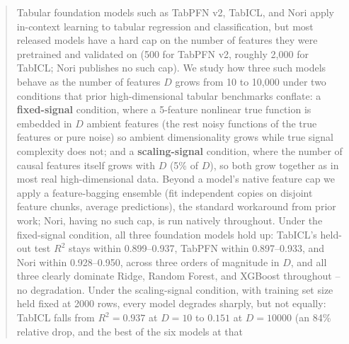 \documentclass{article}
\begin{document}

\printAffiliationsAndNotice{}

\begin{abstract}
Tabular foundation models such as TabPFN v2, TabICL, and Nori apply in-context
learning to tabular regression and classification, but most released models have a
hard cap on the number of features they were pretrained and validated on (500 for
TabPFN v2, roughly 2,000 for TabICL; Nori publishes no such cap). We study how three
such models behave as the number of features $D$ grows from 10 to 10,000 under two
conditions that prior high-dimensional tabular benchmarks conflate: a
\textbf{fixed-signal} condition, where a 5-feature nonlinear true function is embedded
in $D$ ambient features (the rest noisy functions of the true features or pure noise)
so ambient dimensionality grows while true signal complexity does not; and a
\textbf{scaling-signal} condition, where the number of causal features itself grows
with $D$ (5\% of $D$), so both grow together as in most real high-dimensional data.
Beyond a model's native feature cap we apply a feature-bagging ensemble (fit
independent copies on disjoint feature chunks, average predictions), the standard
workaround from prior work; Nori, having no such cap, is run natively throughout.
Under the fixed-signal condition, all three foundation models hold up: TabICL's
held-out test $R^2$ stays within 0.899--0.937, TabPFN within 0.897--0.933, and Nori
within 0.928--0.950, across three orders of magnitude in $D$, and all three clearly
dominate Ridge, Random Forest, and XGBoost throughout -- no degradation. Under the
scaling-signal condition, with training set size held fixed at 2000 rows, every model
degrades sharply, but not equally: TabICL falls from $R^2{=}0.937$ at $D{=}10$ to
$0.151$ at $D{=}10000$ (an 84\% relative drop, and the best of the six models at that

\end{abstract}
\end{document}
